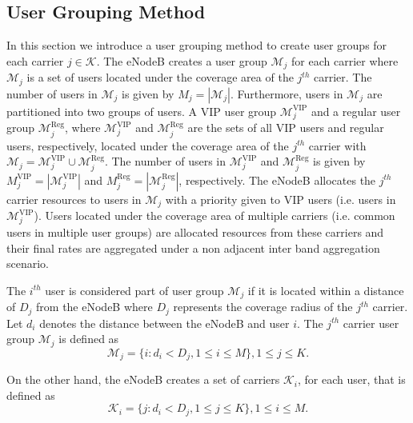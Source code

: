 \documentclass[journal]{IEEEtran} 				\IEEEoverridecommandlockouts 						\usepackage{amsmath,amssymb}
\begin{document}
\subsection{User Grouping Method}\label{sec:UsersGrouping}
In this section we introduce a user grouping method to create user groups for each carrier $j \in \mathcal{K}$. The eNodeB creates a user group $\mathcal{M}_j$ for each carrier where $\mathcal{M}_j$ is a set of users located under the coverage area of the $j^{th}$ carrier. The number of users in $\mathcal{M}_j$ is given by $M_j=|\mathcal{M}_j|$. Furthermore, users in $\mathcal{M}_j$ are partitioned into two groups of users. A VIP user group $\mathcal{M}_j^{\text{VIP}}$ and a regular user group $\mathcal{M}_j^{\text{Reg}}$, where $\mathcal{M}_j^{\text{VIP}}$ and $\mathcal{M}_j^{\text{Reg}}$ are the sets of all VIP users and regular users, respectively, located under the coverage area of the $j^{th}$ carrier with $\mathcal{M}_j=\mathcal{M}_j^{\text{VIP}}\cup \mathcal{M}_j^{\text{Reg}}$. The number of users in $\mathcal{M}_j^{\text{VIP}}$ and $\mathcal{M}_j^{\text{Reg}}$ is given by $M_j^{\text{VIP}}=|\mathcal{M}_j^{\text{VIP}}|$ and $M_j^{\text{Reg}}=|\mathcal{M}_j^{\text{Reg}}|$, respectively. The eNodeB allocates the $j^{th}$ carrier resources to users in $\mathcal{M}_j$ with a priority given to VIP users (i.e. users in $\mathcal{M}_j^{\text{VIP}}$). Users located under the coverage area of multiple carriers (i.e. common users in multiple user groups) are allocated resources from these carriers and their final rates are aggregated under a non adjacent inter band aggregation scenario.

The $i^{th}$ user is considered part of user group $\mathcal{M}_j$ if it is located within a distance of $D_j$ from the eNodeB where $D_j$ represents the coverage radius of the $j^{th}$ carrier. Let $d_i$ denotes the distance between the eNodeB and user $i$. The $j^{th}$ carrier user group $\mathcal{M}_j$ is defined as
\begin{equation}\label{eqn:user_group}
\mathcal{M}_j = \{i : d_i<D_j, 1\leq i \leq M\}, 1 \leq j \leq K.
\end{equation}

On the other hand, the eNodeB creates a set of carriers $\mathcal{K}_i$, for each user, that is defined as
\begin{equation}\label{eqn:K_i}
\mathcal{K}_i = \{j : d_i<D_j, 1\leq j \leq K\}, 1 \leq i \leq M.
\end{equation}
\end{document}
